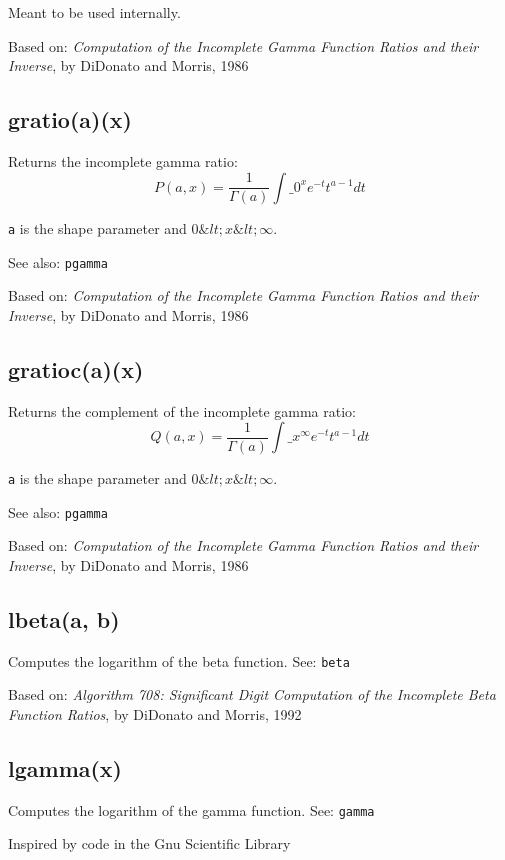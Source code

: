 \documentclass{article}
\begin{document}
Meant to be used internally.


Based on:   \emph{Computation of the Incomplete Gamma Function Ratios
and their Inverse}, by DiDonato and Morris, 1986


    \subsection*{gratio(a)(x)}
    Returns the incomplete gamma ratio:
$$P(a,x) = \frac{1}{\Gamma(a)} \int\_0^x e^{-t} t^{a-1} dt$$


\texttt{a} is the shape parameter and $0 \&lt; x \&lt; \infty$.


See also: \texttt{pgamma}


Based on:  \emph{Computation of the Incomplete Gamma Function Ratios
and their Inverse}, by DiDonato and Morris, 1986


    \subsection*{gratioc(a)(x)}
    Returns the complement of the incomplete gamma ratio:
$$Q(a,x) = \frac{1}{\Gamma(a)} \int\_x^\infty e^{-t} t^{a-1} dt$$


\texttt{a} is the shape parameter and $0 \&lt; x \&lt; \infty$.


See also: \texttt{pgamma}


Based on:  \emph{Computation of the Incomplete Gamma Function Ratios
and their Inverse}, by DiDonato and Morris, 1986


    \subsection*{lbeta(a, b)}
    Computes the logarithm of the beta function.
See: \texttt{beta}


Based on: \emph{Algorithm 708: Significant Digit Computation of the Incomplete Beta Function
Ratios}, by DiDonato and Morris, 1992


    \subsection*{lgamma(x)}
    Computes the logarithm of the gamma function.  See: \texttt{gamma}


Inspired by code in the Gnu Scientific Library
\end{document}
